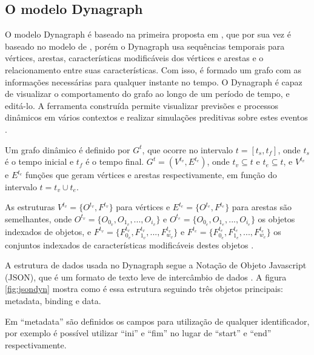 \pagebreak

\subsection{O modelo Dynagraph}
O modelo Dynagraph \cite{dynagraph} é baseado na primeira proposta em \cite{dynagraph2012}, que por sua vez é baseado no modelo
de \cite{kim}, porém o Dynagraph usa sequências temporais para vértices, arestas, características modificáveis dos vértices e arestas e
o relacionamento entre suas características. Com isso, é formado um grafo com as informações necessárias para qualquer instante no tempo.
O Dynagraph é capaz de visualizar o comportamento do grafo ao longo de um período de tempo, e editá-lo. A ferramenta construída permite
visualizar previsões e processos dinâmicos em vários contextos e realizar simulações preditivas sobre estes eventos \cite{dynagraph}.

Um grafo dinâmico é definido por $G^t$, que ocorre no intervalo $t = [t_s,t_f]$, onde $t_s$ é o tempo inicial e $t_f$ é o tempo final.
$G^t = (V^{t_v}, E^{t_e})$, onde $t_v \subseteq t$ e $t_e \subseteq t$, e $V^{t_v}$ e $E^{t_e}$ funções que geram vértices e arestas
respectivamente, em função do intervalo $t=t_v \cup t_e$.

As estruturas $V^{t_v} = \{O^{t_v}, F^{t_v}\}$ para vértices e $E^{t_e} = \{O^{t_e}, F^{t_e}\}$ para arestas são semelhantes,
onde $O^{t_v} = \{O_{0_v}, O_{1_v},..., O_{i_v}\}$ e $O^{t_e} = \{O_{0_e}, O_{1_e},..., O_{i_e}\}$ os objetos indexados de objetos,
e $F^{t_v} = \{F^{t_v}_{0_v}, F^{t_v}_{1_v},..., F^{t_v}_{w_v}\}$ e $F^{t_e} = \{F^{t_e}_{0_e}, F^{t_e}_{1_e},..., F^{t_e}_{w_e}\}$ os
conjuntos indexados de características modificáveis destes objetos \cite{dynagraph}.

A estrutura de dados usada no Dynagraph segue a Notação de Objeto Javascript (JSON), que é um formato de texto leve de intercâmbio de dados \cite{douglas}.
A figura \ref{fig:jsondyn} mostra como é essa estrutura seguindo três objetos principais: metadata, binding e data.

Em ``metadata'' são definidos os campos para utilização de qualquer identificador, por exemplo é possível utilizar ``ini'' e ``fim'' no
lugar de ``start'' e ``end'' respectivamente.

